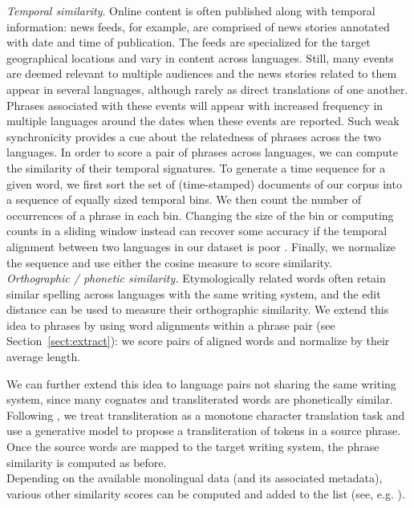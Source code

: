 \documentclass[11pt]{article}
\newcommand{\mnote}[1]{\marginpar{%
  \vskip-\baselineskip
  \raggedright\footnotesize
  \itshape\hrule\smallskip\tiny{#1}\par\smallskip\hrule}}
\newcommand{\mtodo}[1]{\mnote{\textcolor{red}{#1}}}
\newcommand{\secref}[1]{Section~\ref{#1}}
\begin{document}
\noindent\emph{Temporal similarity}. Online content is often published along with temporal information: news feeds, for example, are comprised of news stories annotated with date and time of publication.  The feeds are specialized for the target geographical locations and vary in content across languages.  Still, many events are deemed relevant to multiple audiences and the news stories related to them appear in several languages, although rarely as direct translations of one another.  Phrases associated with these events will appear with increased frequency in multiple languages around the dates when these events are reported.  Such weak synchronicity provides a cue about the relatedness of phrases across the two languages.  In order to score a pair of phrases across languages, we can compute the similarity of their temporal signatures. To generate a time sequence for a given word, we first sort the set of (time-stamped) documents of our corpus into a sequence of equally sized temporal bins.  We then count the number of occurrences of a phrase in each bin.  Changing the size of the bin or computing counts in a sliding window instead can recover some accuracy if the temporal alignment between two languages in our dataset is poor \cite{Klementiev:2006b}.  Finally, we normalize the sequence and use either the cosine measure to score similarity. \\

\noindent\emph{Orthographic / phonetic similarity.} Etymologically related words often retain similar spelling across languages with the same writing system, and the edit distance can be used to measure their orthographic similarity.  We extend this idea to phrases by using word alignments within a phrase pair (see \secref{sect:extract}): we score pairs of aligned words and normalize by their average length. \mtodo{Make sure it is correct.}

We can further extend this idea to language pairs not sharing the same writing system, since many cognates and transliterated words are phonetically similar.  Following \cite{Virga:2003,Irvine:2010a}, we treat transliteration as a monotone character translation task and use a generative model\mtodo{Argue that enough training data is easy to get} to propose a transliteration of tokens in a source phrase.  Once the source words are mapped to the target writing system, the phrase similarity is computed as before.\\

Depending on the available monolingual data (and its associated metadata), various other similarity scores can be computed and added to the list (see, e.g. \cite{Schafer:2002}).
\end{document}
